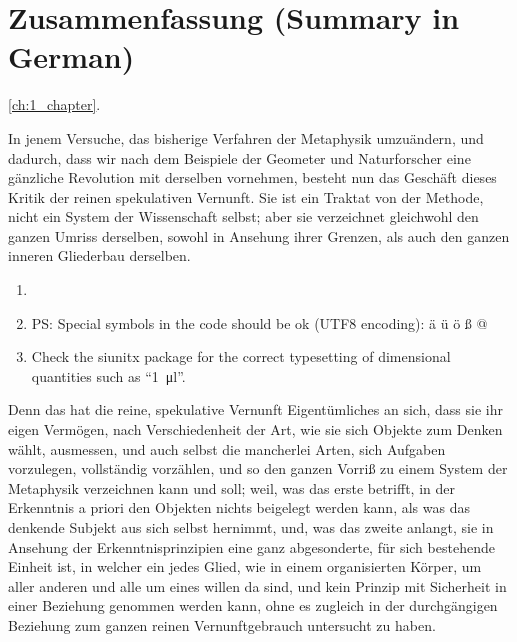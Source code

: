 \chapter[Zusammenfassung (Summary in German)]{Zusammenfassung {\hfill\small (Summary in German)}}

 \cref{ch:1_chapter}.

 In jenem Versuche, das bisherige Verfahren der Metaphysik umzu\"andern,
und dadurch, dass wir nach dem Beispiele der Geometer und Naturforscher
eine g\"anzliche Revolution mit derselben vornehmen, besteht nun das
Gesch\"aft dieses Kritik der reinen spekulativen Vernunft. Sie ist ein
Traktat von der Methode, nicht ein System der Wissenschaft selbst;
aber sie verzeichnet gleichwohl den ganzen Umriss derselben, sowohl
in Ansehung ihrer Grenzen, als auch den ganzen inneren Gliederbau
derselben. 
%
	\begin{enumerate}[itemsep=0ex, topsep=1ex]%
	\item {}
	\item PS: Special symbols in the code should be ok (UTF8 encoding): ä ü ö ß @
	\item Check the siunitx package for the correct typesetting of dimensional quantities such as ``\SI{1}{\micro\litre}''.
\end{enumerate}
%
 Denn das hat die reine, spekulative Vernunft Eigent\"umliches
an sich, dass sie ihr eigen Verm\"ogen, nach Verschiedenheit der Art,
wie sie sich Objekte zum Denken w\"ahlt, ausmessen, und auch selbst die
mancherlei Arten, sich Aufgaben vorzulegen, vollst\"andig vorz\"ahlen, und
so den ganzen Vorri\ss{} zu einem System der Metaphysik verzeichnen kann
und soll; weil, was das erste betrifft, in der Erkenntnis a priori den
Objekten nichts beigelegt werden kann, als was das denkende Subjekt
aus sich selbst hernimmt, und, was das zweite anlangt, sie in Ansehung
der Erkenntnisprinzipien eine ganz abgesonderte, f\"ur sich bestehende
Einheit ist, in welcher ein jedes Glied, wie in einem organisierten
K\"orper, um aller anderen und alle um eines willen da sind, und kein
Prinzip mit Sicherheit in einer Beziehung genommen werden kann,
ohne es zugleich in der durchg\"angigen Beziehung zum ganzen
reinen Vernunftgebrauch untersucht zu haben. 

